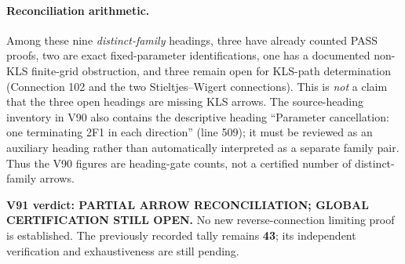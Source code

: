 \documentclass[11pt]{article}
\begin{document}
\paragraph{Reconciliation arithmetic.} Among these nine \emph{distinct-family} headings, three have already counted PASS proofs, two are exact fixed-parameter identifications, one has a documented non-KLS finite-grid obstruction, and three remain open for KLS-path determination (Connection 102 and the two Stieltjes--Wigert connections). This is \emph{not} a claim that the three open headings are missing KLS arrows. The source-heading inventory in V90 also contains the descriptive heading ``Parameter cancellation: one terminating 2F1 in each direction'' (line 509); it must be reviewed as an auxiliary heading rather than automatically interpreted as a separate family pair. Thus the V90 figures are heading-gate counts, not a certified number of distinct-family arrows.

\noindent\textbf{V91 verdict: PARTIAL ARROW RECONCILIATION; GLOBAL CERTIFICATION STILL OPEN.} No new reverse-connection limiting proof is established. The previously recorded tally remains \textbf{43}; its independent verification and exhaustiveness are still pending.
\end{document}

